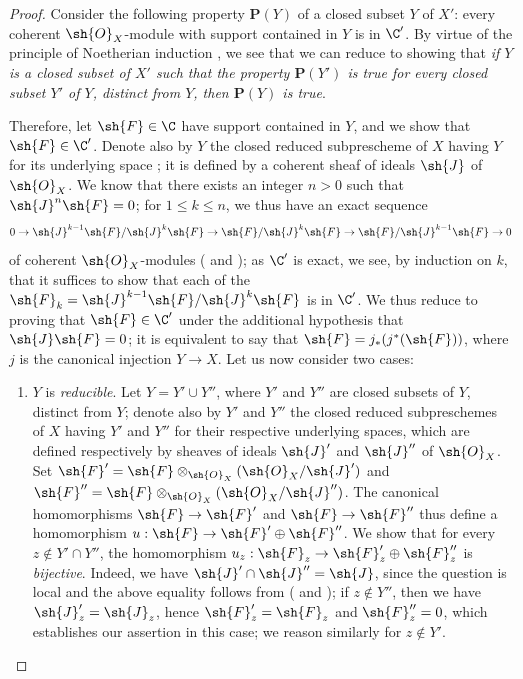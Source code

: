 \begin{proof}
Consider the following property $\textbf{P}(Y)$ of a closed subset $Y$ of $X'$: every coherent $\sh{O}_X$-module with support contained in $Y$ is in $\C'$.
By virtue of the principle of Noetherian induction , we see that we can reduce to showing that \emph{if $Y$ is a closed subset of $X'$ such that the property $\textbf{P}(Y')$ is true for every closed subset $Y'$ of $Y$, distinct from $Y$, then $\textbf{P}(Y)$ is true}.

Therefore, let $\sh{F}\in\C$ have support contained in $Y$, and we show that $\sh{F}\in\C'$.
Denote also by $Y$ the closed reduced subprescheme of $X$ having $Y$ for its underlying space ; it is defined by a coherent sheaf of ideals $\sh{J}$ of $\sh{O}_X$.
We know  that there exists an integer $n>0$ such that $\sh{J}^n\sh{F}=0$; for $1\leq k\leq n$, we thus have an exact sequence
\[
  0\to\sh{J}^{k-1}\sh{F}/\sh{J}^k\sh{F}\to\sh{F}/\sh{J}^k\sh{F}\to\sh{F}/\sh{J}^{k-1}\sh{F}\to 0
\]
 of coherent $\sh{O}_X$-modules ( and ); as $\C'$ is exact, we see, by induction on $k$, that it suffices to show that each of the $\sh{F}_k=\sh{J}^{k-1}\sh{F}/\sh{J}^k\sh{F}$ is in $\C'$.
We thus reduce to proving that $\sh{F}\in\C'$ under the additional hypothesis that $\sh{J}\sh{F}=0$; it is equivalent to say that $\sh{F}=j_*(j^*(\sh{F}))$, where $j$ is the canonical injection $Y\to X$.
Let us now consider two cases:
\begin{enumerate}
  \item[(a)] $Y$ is \emph{reducible}.
    Let $Y=Y'\cup Y''$, where $Y'$ and $Y''$ are closed subsets of $Y$, distinct from $Y$; denote also by $Y'$ and $Y''$ the closed reduced subpreschemes of $X$ having $Y'$ and $Y''$ for their respective underlying spaces, which are defined respectively by sheaves of ideals $\sh{J}'$ and $\sh{J}''$ of $\sh{O}_X$.
    Set $\sh{F}'=\sh{F}\otimes_{\sh{O}_X}(\sh{O}_X/\sh{J}')$ and $\sh{F}''=\sh{F}\otimes_{\sh{O}_X}(\sh{O}_X/\sh{J}'')$.
    The canonical homomorphisms $\sh{F}\to\sh{F}'$ and $\sh{F}\to\sh{F}''$ thus define a homomorphism $u:\sh{F}\to\sh{F}'\oplus\sh{F}''$.
    We show that for every $z\not\in Y'\cap Y''$, the homomorphism $u_z:\sh{F}_z\to\sh{F}_z'\oplus\sh{F}_z''$ is \emph{bijective}.
    Indeed, we have $\sh{J}'\cap\sh{J}''=\sh{J}$, since the question is local and
    the above equality follows from ( and ); if $z\not\in Y''$, then we have $\sh{J}_z'=\sh{J}_z$, hence $\sh{F}_z'=\sh{F}_z$ and $\sh{F}_z''=0$, which establishes our assertion in this case; we reason similarly for $z\not\in Y'$.

\end{enumerate}
\end{proof}
